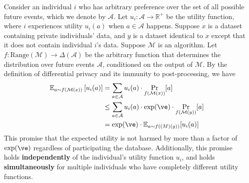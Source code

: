 Consider an individual \(i\) who has arbitrary preference over the set of all possible future events, which we denote by \(\mathcal{A}\). Let \(u_i: \mathcal{A} \to \mathbb{R}^+\) be the utility function, where \(i\) experiences utility \(u_i(a)\) when \(a \in \mathcal{A}\) happens. Suppose \(x\) is a dataset containing private individuals' data, and \(y\) is a dataset identical to \(x\) except that it does not contain individual \(i\)'s data. Suppose \(\mathcal{M}\) is an \edip algorithm. Let \(f: \text{Range}(\mathcal{M}) \to \Delta(\mathcal{A})\) be the arbitrary function that determines the distribution over future events \(\mathcal{A}\), conditioned on the output of \(\mathcal{M}\). By the definition of differential privacy and its immunity to post-processing, we have
\begin{align*}
    \mathbb{E}_{a \sim f(\mathcal{M}(x))} \left[u_i(a)\right] &= \sum_{a \in \mathcal{A}} u_i(a) \cdot \Pr_{f(\mathcal{M}(x))}[a]
    \\ &\le \sum_{a \in \mathcal{A}} u_i(a) \cdot \exp (\ve) \cdot \Pr_{f(\mathcal{M}(y))}[a]
    \\ &= \exp (\ve) \cdot \mathbb{E}_{a \sim f(\mathcal(M)(y))} [u_i(a)]
\end{align*}
This promise that the expected utility is not harmed by more than a factor of \(\exp(\ve)\) regardless of participating the database. Additionally, this promise holds \textbf{independently} of the individual's utility function \(u_i\), and holds \textbf{simultaneously} for multiple individuals who have completely different utility functions.